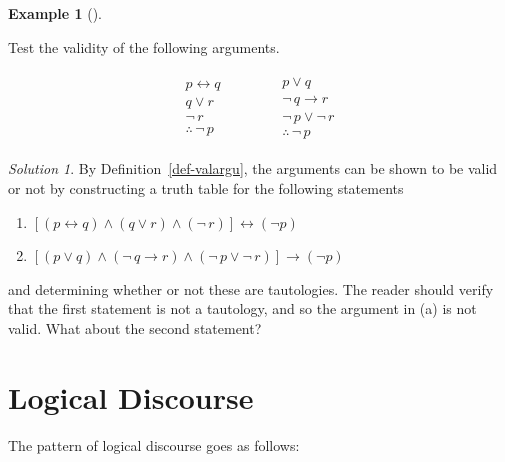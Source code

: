 \documentclass[
  letterpaper,
  10pt,
  reqno,
  twopage,
  openany]{book}
\providecommand{\tightlist}{%
  \setlength{\itemsep}{0pt}\setlength{\parskip}{0pt}}\usepackage{longtable,booktabs,array}
\theoremstyle{plain}
\theoremstyle{definition}
\theoremstyle{definition}
\theoremstyle{definition}
\newtheorem{example}{Example}[chapter]
\theoremstyle{plain}
\theoremstyle{plain}
\theoremstyle{remark}
\newtheorem*{solution}{Solution}
\begin{document}
\leavevmode{}%
\begin{example}[]\label{exm-test-validity}

Test the validity of the following arguments.

\[\begin{array}{ccc} 
\begin{array}{l} 
p \longleftrightarrow q \\
q \lor r  \\ 
\neg \, r \\ \hline
\therefore \, \neg \, p 
\end{array}
& \qquad &
\begin{array}{l}
p \lor q \\
\neg \, q \rightarrow r \\ 
\neg \, p \lor \neg \, r \\ \hline
\therefore \, \neg \, p
\end{array}
\end{array}\]

\end{example}

\begin{solution}

By Definition~\ref{def-valargu}, the arguments can be shown to be valid
or not by constructing a truth table for the following statements

\begin{enumerate}
\def\labelenumi{\arabic{enumi}.}
\tightlist
\item
  \([(p \longleftrightarrow q)\land (q \lor r ) \land (\neg \, r )] \longleftrightarrow (\neg p)\)
\item
  \([(p \lor q)\land (\neg \, q \rightarrow r)\land (\neg \, p \lor \neg \, r)] \longrightarrow (\neg p)\)
\end{enumerate}

and determining whether or not these are tautologies. The reader should
verify that the first statement is not a tautology, and so the argument
in (a) is not valid. What about the second statement?

\end{solution}

\hypertarget{logical-discourse}{%
\section{Logical Discourse}\label{logical-discourse}}

The pattern of logical discourse goes as follows:
\end{document}
